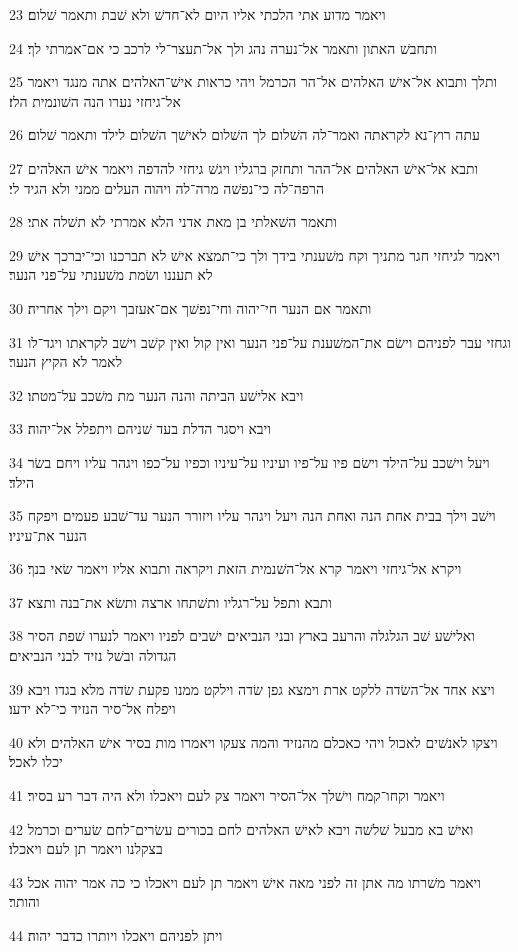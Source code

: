 \par 23 ויאמר מדוע אתי הלכתי אליו היום לא־חדשׁ ולא שׁבת ותאמר שׁלום׃
\par 24 ותחבשׁ האתון ותאמר אל־נערה נהג ולך אל־תעצר־לי לרכב כי אם־אמרתי לך׃
\par 25 ותלך ותבוא אל־אישׁ האלהים אל־הר הכרמל ויהי כראות אישׁ־האלהים אתה מנגד ויאמר אל־גיחזי נערו הנה השׁונמית הלז׃
\par 26 עתה רוץ־נא לקראתה ואמר־לה השׁלום לך השׁלום לאישׁך השׁלום לילד ותאמר שׁלום׃
\par 27 ותבא אל־אישׁ האלהים אל־ההר ותחזק ברגליו ויגשׁ גיחזי להדפה ויאמר אישׁ האלהים הרפה־לה כי־נפשׁה מרה־לה ויהוה העלים ממני ולא הגיד לי׃
\par 28 ותאמר השׁאלתי בן מאת אדני הלא אמרתי לא תשׁלה אתי׃
\par 29 ויאמר לגיחזי חגר מתניך וקח משׁענתי בידך ולך כי־תמצא אישׁ לא תברכנו וכי־יברכך אישׁ לא תעננו ושׂמת משׁענתי על־פני הנער׃
\par 30 ותאמר אם הנער חי־יהוה וחי־נפשׁך אם־אעזבך ויקם וילך אחריה׃
\par 31 וגחזי עבר לפניהם וישׂם את־המשׁענת על־פני הנער ואין קול ואין קשׁב וישׁב לקראתו ויגד־לו לאמר לא הקיץ הנער׃
\par 32 ויבא אלישׁע הביתה והנה הנער מת משׁכב על־מטתו׃
\par 33 ויבא ויסגר הדלת בעד שׁניהם ויתפלל אל־יהוה׃
\par 34 ויעל וישׁכב על־הילד וישׂם פיו על־פיו ועיניו על־עיניו וכפיו על־כפו ויגהר עליו ויחם בשׂר הילד׃
\par 35 וישׁב וילך בבית אחת הנה ואחת הנה ויעל ויגהר עליו ויזורר הנער עד־שׁבע פעמים ויפקח הנער את־עיניו׃
\par 36 ויקרא אל־גיחזי ויאמר קרא אל־השׁנמית הזאת ויקראה ותבוא אליו ויאמר שׂאי בנך׃
\par 37 ותבא ותפל על־רגליו ותשׁתחו ארצה ותשׂא את־בנה ותצא׃
\par 38 ואלישׁע שׁב הגלגלה והרעב בארץ ובני הנביאים ישׁבים לפניו ויאמר לנערו שׁפת הסיר הגדולה ובשׁל נזיד לבני הנביאים׃
\par 39 ויצא אחד אל־השׂדה ללקט ארת וימצא גפן שׂדה וילקט ממנו פקעת שׂדה מלא בגדו ויבא ויפלח אל־סיר הנזיד כי־לא ידעו׃
\par 40 ויצקו לאנשׁים לאכול ויהי כאכלם מהנזיד והמה צעקו ויאמרו מות בסיר אישׁ האלהים ולא יכלו לאכל׃
\par 41 ויאמר וקחו־קמח וישׁלך אל־הסיר ויאמר צק לעם ויאכלו ולא היה דבר רע בסיר׃
\par 42 ואישׁ בא מבעל שׁלשׁה ויבא לאישׁ האלהים לחם בכורים עשׂרים־לחם שׂערים וכרמל בצקלנו ויאמר תן לעם ויאכלו׃
\par 43 ויאמר משׁרתו מה אתן זה לפני מאה אישׁ ויאמר תן לעם ויאכלו כי כה אמר יהוה אכל והותר׃
\par 44 ויתן לפניהם ויאכלו ויותרו כדבר יהוה׃

